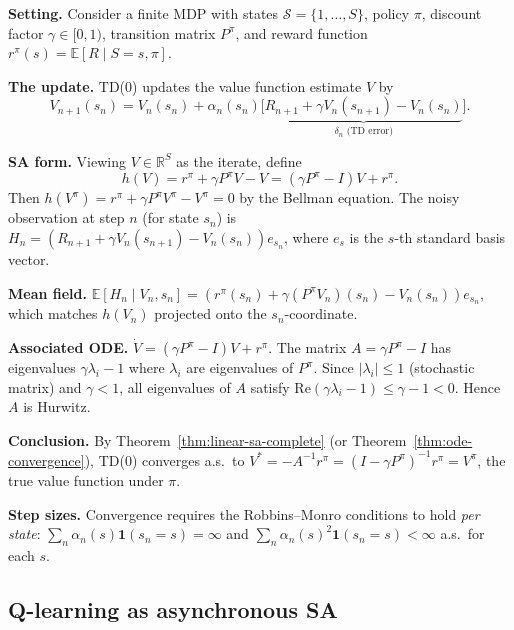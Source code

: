 \documentclass[11pt,a4paper]{article}
\theoremstyle{definition}
\theoremstyle{plain}
\theoremstyle{remark}
\newcommand{\R}{\mathbb{R}}
\newcommand{\E}{\mathbb{E}}
\newcommand{\indicator}{\mathbf{1}}
\begin{document}
\begin{rlconnection}
\textbf{Setting.} Consider a finite MDP with states $\mathcal{S} = \{1, \ldots, S\}$,
policy $\pi$, discount factor $\gamma \in [0, 1)$, transition matrix $P^\pi$, and
reward function $r^\pi(s) = \E[R \mid S = s, \pi]$.

\textbf{The update.} TD(0) updates the value function estimate $V$ by
\[
  V_{n+1}(s_n) = V_n(s_n) + \alpha_n(s_n) \bigl[\underbrace{R_{n+1} + \gamma V_n(s_{n+1}) - V_n(s_n)}_{\delta_n \text{ (TD error)}}\bigr].
\]

\textbf{SA form.} Viewing $V \in \R^S$ as the iterate, define
\[
  h(V) = r^\pi + \gamma P^\pi V - V = (\gamma P^\pi - I)V + r^\pi.
\]
Then $h(V^\pi) = r^\pi + \gamma P^\pi V^\pi - V^\pi = 0$ by the Bellman equation.
The noisy observation at step $n$ (for state $s_n$) is
$H_n = (R_{n+1} + \gamma V_n(s_{n+1}) - V_n(s_n)) e_{s_n}$, where $e_s$ is the
$s$-th standard basis vector.

\textbf{Mean field.} $\E[H_n \mid V_n, s_n] = (r^\pi(s_n) + \gamma (P^\pi V_n)(s_n) - V_n(s_n)) e_{s_n}$, which matches $h(V_n)$ projected onto the $s_n$-coordinate.

\textbf{Associated ODE.} $\dot{V} = (\gamma P^\pi - I)V + r^\pi$. The matrix
$A = \gamma P^\pi - I$ has eigenvalues $\gamma \lambda_i - 1$ where $\lambda_i$ are
eigenvalues of $P^\pi$. Since $|\lambda_i| \leq 1$ (stochastic matrix) and
$\gamma < 1$, all eigenvalues of $A$ satisfy
$\mathrm{Re}(\gamma \lambda_i - 1) \leq \gamma - 1 < 0$. Hence $A$ is Hurwitz.

\textbf{Conclusion.} By Theorem~\ref{thm:linear-sa-complete} (or
Theorem~\ref{thm:ode-convergence}), TD(0) converges a.s.\ to
$V^* = -A^{-1}r^\pi = (I - \gamma P^\pi)^{-1}r^\pi = V^\pi$, the true value
function under $\pi$.

\textbf{Step sizes.} Convergence requires the Robbins--Monro conditions to hold
\emph{per state}: $\sum_n \alpha_n(s) \indicator(s_n = s) = \infty$ and
$\sum_n \alpha_n(s)^2 \indicator(s_n = s) < \infty$ a.s.\ for each $s$.
\end{rlconnection}

\subsection{Q-learning as asynchronous SA}
\end{document}
